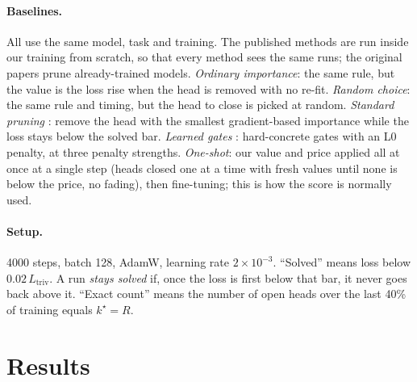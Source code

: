 \documentclass[11pt]{article}
\begin{document}
\paragraph{Baselines.} All use the same model, task and training. The published methods are run
inside our training from scratch, so that every method sees the same runs; the original papers prune
already-trained models. \emph{Ordinary importance}: the
same rule, but the value is the loss rise when the head is removed with no re-fit. \emph{Random
choice}: the same rule and timing, but the head to close is picked at random. \emph{Standard
pruning} \citep{michel}: remove the head with the smallest gradient-based importance while the
loss stays below the solved bar. \emph{Learned gates} \citep{voita,louizos}: hard-concrete gates with
an L0 penalty, at three penalty strengths. \emph{One-shot}: our value and price applied all at once
at a single step (heads closed one at a time with fresh values until none is below the price, no
fading), then fine-tuning; this is how the score is normally used.

\paragraph{Setup.} 4000 steps, batch 128, AdamW, learning rate $2 \times 10^{-3}$. ``Solved'' means
loss below $0.02\, L_{\text{triv}}$. A run \emph{stays solved} if, once the loss is first below
that bar, it never goes back above it. ``Exact count'' means the number of open heads over the last
40\% of training equals $k^\star = R$.

\section{Results}
\label{sec:results}
\end{document}
